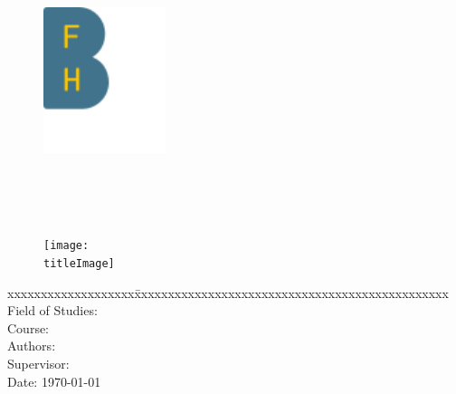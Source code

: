 \thispagestyle{empty}

\begin{figure}
	\includegraphics[scale=1,valign=t]{BFH_Logo_A_en_100_4CU.pdf}
\end{figure}


\begin{minipage}[c][3cm][c]{\linewidth} {
	\centering
	\vspace*{2cm}
	{\fontsize{24pt}{0pt}\selectfont \textbf{\doctitle}}  \\
	\vspace*{0.6cm}
	{\fontsize{20pt}{0pt}\selectfont \docsubject}  \\
	\vspace*{1cm}
	{\fontsize{14pt}{0pt}\selectfont \doctype}  \\
}
\end{minipage}


\vspace{1.5cm}


\begin{figure}[H]
	\centering
	\makebox[0.8\linewidth]{\color{BFHGray} \rule{0.8\linewidth}{10pt}}
	\texttt{[image: \\titleImage]}
	\makebox[0.8\linewidth]{\color{BFHGray} \rule{0.8\linewidth}{10pt}}
\end{figure}

\vfill

\begin{minipage}[c][3cm][c]{\linewidth}
{
	\centering
	\begin{tabbing}
		xxxxxxxxxxxxxxxxxxx\=xxxxxxxxxxxxxxxxxxxxxxxxxxxxxxxxxxxxxxxxxxxxxxx \kill
		Field of Studies:	\> \fieldofstudies \\
		Course:			\> \course \\
		Authors:		\> \docauthor \\
		Supervisor:		\> \prof \\
		Date:			\> \today \\
	\end{tabbing}
}
\end{minipage}

\pagebreak
